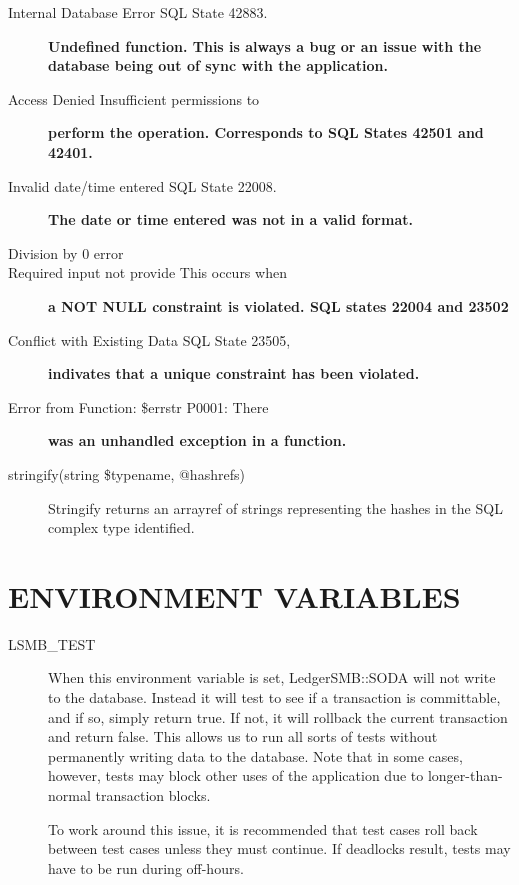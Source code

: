 \begin{description}
\begin{description}
\begin{description}
\begin{description}
\begin{description}
\begin{description}
\begin{description}
\begin{description}

\item[{Internal Database Error SQL State 42883.}] \textbf{Undefined function. This is always a bug or an issue with the database being out of sync with the application.}
\item[{Access Denied Insufficient permissions to}] \textbf{perform the operation. Corresponds to SQL States 42501 and 42401.}
\item[{Invalid date/time entered SQL State 22008.}] \textbf{The date or time entered was not in a valid format.}
\item[{Division by 0 error}] \mbox{}
\item[{Required input not provide This occurs when}] \textbf{a NOT NULL constraint is violated. SQL states 22004 and 23502}
\item[{Conflict with Existing Data SQL State 23505,}] \textbf{indivates that a unique constraint has been violated.}
\item[{Error from Function: \$errstr P0001: There}] \textbf{was an unhandled exception in a function.}
\item[{stringify(string \$typename, @hashrefs)}] \mbox{}

Stringify returns an arrayref of strings representing the hashes in the SQL
complex type identified.

\end{description}
\section{ENVIRONMENT VARIABLES\label{ENVIRONMENT_VARIABLES}}
\begin{description}

\item[{LSMB\_TEST}] \mbox{}

When this environment variable is set, LedgerSMB::SODA will not write to the
database.  Instead it will test to see if a transaction is committable, and if 
so, simply return true.  If not, it will rollback the current transaction and
return false.  This allows us to run all sorts of tests without permanently
writing data to the database.  Note that in some cases, however, tests may block
other uses of the application due to longer-than-normal transaction blocks.



To work around this issue, it is recommended that test cases roll back between
test cases unless they must continue.  If deadlocks result, tests may have to be
run during off-hours.


\end{description}
\end{description}
\end{description}
\end{description}
\end{description}
\end{description}
\end{description}
\end{description}
